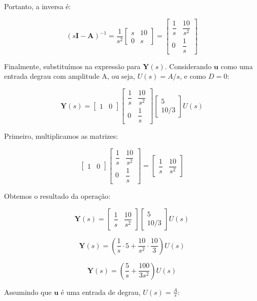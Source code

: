 \documentclass[a4paper,11pt]{article}
\begin{document}
Portanto, a inversa é:

$$
(s\textbf{I} - \textbf{A})^{-1} = \frac{1}{s^2}\begin{bmatrix} s & 10 \\ 0 & s \end{bmatrix} = \begin{bmatrix} \dfrac{1}{s} & \dfrac{10}{s^2} \\ 0 & \dfrac{1}{s} \end{bmatrix}
$$

Finalmente, substituímos na expressão para $\textbf{Y}(s)$. Considerando $\textbf{u}$ como uma entrada degrau com amplitude A, ou seja, $U(s) = A/s$, e como $D=0$:

$$
\textbf{Y}(s) = \begin{bmatrix} 1 & 0 \end{bmatrix} \begin{bmatrix} \dfrac{1}{s} & \dfrac{10}{s^2} \\ 0 & \dfrac{1}{s} \end{bmatrix} \begin{bmatrix} 5 \\ 10/3 \end{bmatrix} U(s)
$$

Primeiro, multiplicamos as matrizes:

$$
\begin{bmatrix} 1 & 0 \end{bmatrix} \begin{bmatrix} \dfrac{1}{s} & \dfrac{10}{s^2} \\ 0 & \dfrac{1}{s} \end{bmatrix} = \begin{bmatrix} \dfrac{1}{s} & \dfrac{10}{s^2} \end{bmatrix}
$$

Obtemos o resultado da operação:

$$
\textbf{Y}(s) = \begin{bmatrix} \dfrac{1}{s} & \dfrac{10}{s^2} \end{bmatrix} \begin{bmatrix} 5 \\ 10/3 \end{bmatrix} U(s)
$$

$$
\textbf{Y}(s) = \left( \dfrac{1}{s} \cdot 5 + \dfrac{10}{s^2} \cdot \dfrac{10}{3} \right) U(s)
$$

$$
\textbf{Y}(s) = \left( \dfrac{5}{s} + \dfrac{100}{3s^2} \right) U(s)
$$

Assumindo que $\textbf{u}$ é uma entrada de degrau, $U(s) = \frac{A}{s}$:
\end{document}
